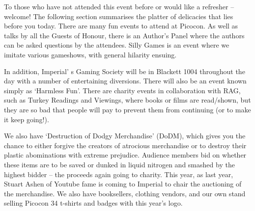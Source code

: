 To those who have not attended this event before or would like a refresher – welcome! The following section summarises the platter of delicacies that lies before you today.  There are many fun events to attend at Picocon. As well as talks by all the Guests of Honour, there is an Author’s Panel where the authors can be asked questions by the attendees. Silly Games is an event where we imitate various gameshows, with general hilarity ensuing.

In addition, Imperial’ s Gaming Society will be in Blackett 1004 throughout the day with a number of entertaining diversions. There will also be an event known simply as ‘Harmless Fun’. There are charity events in collaboration with RAG, such as Turkey Readings and Viewings, where books or films are read/shown, but they are so bad that people will pay to prevent them from continuing (or to make it keep going!). 

We also have ‘Destruction of Dodgy Merchandise’ (DoDM), which gives you the chance to either forgive the creators of atrocious merchandise or to destroy their plastic abominations with extreme prejudice. Audience members bid on whether these items are to be saved or dunked in liquid nitrogen and smashed by the highest bidder – the proceeds again going to charity. This year, as last year, Stuart Ashen of Youtube fame is coming to Imperial to chair the auctioning of the merchandise. We also have booksellers, clothing vendors, and our own stand selling Picocon 34 t-shirts and badges with this year’s logo.